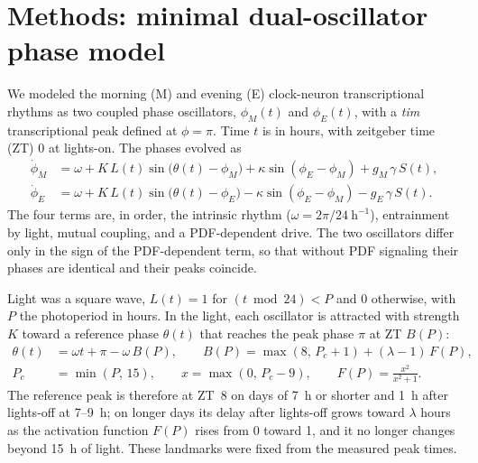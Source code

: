 \section*{Methods: minimal dual-oscillator phase model}

We modeled the morning (M) and evening (E) clock-neuron transcriptional
rhythms as two coupled phase oscillators, $\phi_M(t)$ and $\phi_E(t)$,
with a \textit{tim} transcriptional peak defined at $\phi = \pi$. Time
$t$ is in hours, with zeitgeber time (ZT) 0 at lights-on. The phases
evolved as
\begin{equation}
\begin{aligned}
\dot\phi_M &= \omega + K\,L(t)\sin\bigl(\theta(t)-\phi_M\bigr)
              + \kappa\sin(\phi_E-\phi_M) + g_M\,\gamma\,S(t), \\
\dot\phi_E &= \omega + K\,L(t)\sin\bigl(\theta(t)-\phi_E\bigr)
              - \kappa\sin(\phi_E-\phi_M) - g_E\,\gamma\,S(t).
\end{aligned}
\end{equation}
The four terms are, in order, the intrinsic rhythm
($\omega = 2\pi/24\ \mathrm{h}^{-1}$), entrainment by light, mutual
coupling, and a PDF-dependent drive. The two oscillators differ only in
the sign of the PDF-dependent term, so that without PDF signaling their
phases are identical and their peaks coincide.

Light was a square wave, $L(t) = 1$ for $(t \bmod 24) < P$ and $0$
otherwise, with $P$ the photoperiod in hours. In the light, each
oscillator is attracted with strength $K$ toward a reference phase
$\theta(t)$ that reaches the peak phase $\pi$ at ZT $B(P)$:
\begin{equation}
\begin{aligned}
\theta(t) &= \omega t + \pi - \omega\,B(P), \qquad
B(P) = \max(8,\,P_c+1) + (\lambda-1)\,F(P), \\
P_c &= \min(P,\,15), \qquad x = \max(0,\,P_c-9), \qquad
F(P) = \frac{x^2}{x^2+1}.
\end{aligned}
\end{equation}
The reference peak is therefore at ZT~8 on days of 7~h or shorter and
1~h after lights-off at 7--9~h; on longer days its delay after lights-off
grows toward $\lambda$ hours as the activation function $F(P)$ rises from
0 toward 1, and it no longer changes beyond 15~h of light. These
landmarks were fixed from the measured peak times.

